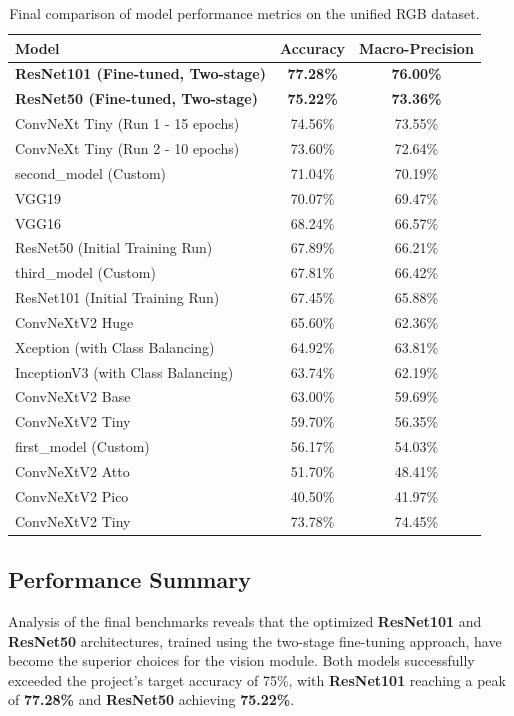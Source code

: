 \documentclass{article}
\begin{document}
\begin{table}[H]
    \centering
    \begin{tabular}{|l|c|c|}
        \hline
        \textbf{Model} & \textbf{Accuracy} & \textbf{Macro-Precision} \\
        \hline
        \textbf{ResNet101 (Fine-tuned, Two-stage)} & \textbf{77.28\%} & \textbf{76.00\%} \\
        \textbf{ResNet50 (Fine-tuned, Two-stage)} & \textbf{75.22\%} & \textbf{73.36\%} \\
        ConvNeXt Tiny (Run 1 - 15 epochs) & 74.56\% & 73.55\% \\
        ConvNeXt Tiny (Run 2 - 10 epochs) & 73.60\% & 72.64\% \\
        second\_model (Custom) & 71.04\% & 70.19\% \\
        VGG19 & 70.07\% & 69.47\% \\
        VGG16 & 68.24\% & 66.57\% \\
        ResNet50 (Initial Training Run) & 67.89\% & 66.21\% \\
        third\_model (Custom) & 67.81\% & 66.42\% \\
        ResNet101 (Initial Training Run) & 67.45\% & 65.88\% \\
        ConvNeXtV2 Huge & 65.60\% & 62.36\% \\
        Xception (with Class Balancing) & 64.92\% & 63.81\% \\
        InceptionV3 (with Class Balancing) & 63.74\% & 62.19\% \\
        ConvNeXtV2 Base & 63.00\% & 59.69\% \\
        ConvNeXtV2 Tiny & 59.70\% & 56.35\% \\
        first\_model (Custom) & 56.17\% & 54.03\% \\
        ConvNeXtV2 Atto & 51.70\% & 48.41\% \\
        ConvNeXtV2 Pico & 40.50\% & 41.97\% \\
        ConvNeXtV2 Tiny & 73.78\% & 74.45\% \\
        \hline
    \end{tabular}
    \caption{Final comparison of model performance metrics on the unified RGB dataset.}
    \label{tab:final_results_updated}
\end{table}

\subsection{Performance Summary}
Analysis of the final benchmarks reveals that the optimized \textbf{ResNet101} and \textbf{ResNet50} architectures, trained using the two-stage fine-tuning approach, have become the superior choices for the vision module. Both models successfully exceeded the project's target accuracy of 75\%, with \textbf{ResNet101} reaching a peak of \textbf{77.28\%} and \textbf{ResNet50} achieving \textbf{75.22\%}. 
\end{document}
